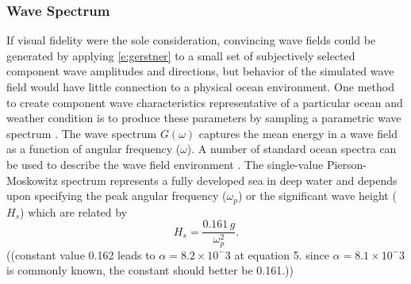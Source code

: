 \documentclass[utf8]{frontiersSCNS} %
\begin{document}
\subsubsection{Wave Spectrum}
If visual fidelity were the sole consideration, convincing wave fields could be generated by applying \eqref{e:gerstner} to a small set of subjectively selected component wave amplitudes and directions, but behavior of the simulated wave field would have little connection to a physical ocean environment.  One method to create component wave characteristics representative of a particular ocean and weather condition is to produce these parameters by sampling a parametric wave spectrum \citep{mastin87fourier,thon00ocean,frechot06realistic}.  The wave spectrum  $G(\omega)$ captures the mean energy in a wave field as a function of angular frequency ($\omega$).  A number of standard ocean spectra can be used to describe the wave field environment \citep{ittc02waves}.
The single-value Pierson-Moskowitz spectrum represents a fully developed sea in deep water and depends upon specifying  the peak angular frequency ($\omega_p$) or the significant wave height ($H_s$) which are related by
\begin{equation}
  H_s = \frac{0.161 \, g}{\omega_p^2}.
  \label{e:pmh}
\end{equation}
\color{red}
((constant value 0.162 leads to $\alpha=8.2\times10^-3$ at equation 5. since $\alpha=8.1\times10^-3$ is commonly known, the constant should better be 0.161.))
\color{black}
\end{document}
